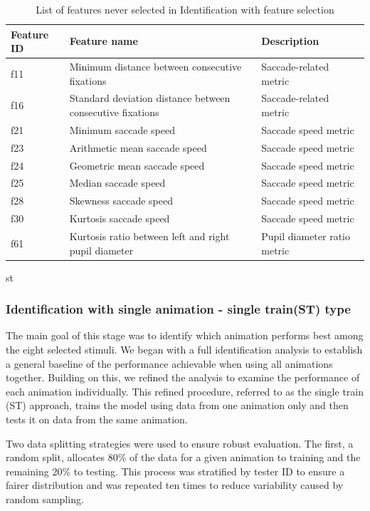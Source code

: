 \documentclass{article}
\begin{document}
\begin{table}[H]
\centering
\small
\setlength{\tabcolsep}{4pt} %
\caption{List of features never selected in Identification with feature selection}
\label{tab:ns_id}
\begin{tabular}{lll}
\toprule
\textbf{Feature ID} & \textbf{Feature name} & \textbf{Description} \\
\midrule
f11 & Minimum distance between consecutive fixations & Saccade-related metric \\
f16 & Standard deviation distance between consecutive fixations & Saccade-related metric \\
f21 & Minimum saccade speed & Saccade speed metric \\
f23 & Arithmetic mean saccade speed & Saccade speed metric \\
f24 & Geometric mean saccade speed & Saccade speed metric \\
f25 & Median saccade speed & Saccade speed metric \\
f28 & Skewness saccade speed & Saccade speed metric \\
f30 & Kurtosis saccade speed & Saccade speed metric \\
f61 & Kurtosis ratio between left and right pupil diameter & Pupil diameter ratio metric \\
\bottomrule
\end{tabular}st
\end{table}

\subsubsection{Identification with single animation - single train(ST) type}

The main goal of this stage was to identify which animation performs best among the eight selected stimuli. 
We began with a full identification analysis to establish a general baseline of the performance achievable when using all animations together. 
Building on this, we refined the analysis to examine the performance of each animation individually. 
This refined procedure, referred to as the single train (ST) approach, trains the model using data from one animation only and then tests it on data from the same animation.

Two data splitting strategies were used to ensure robust evaluation. 
The first, a random split, allocates 80\% of the data for a given animation to training and the remaining 20\% to testing.
This process was stratified by tester ID to ensure a fairer distribution and was repeated ten times to reduce variability caused by random sampling.
\end{document}
